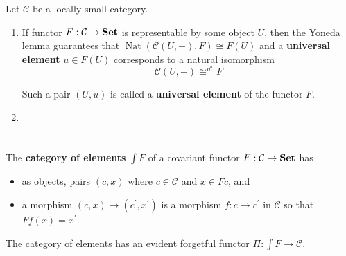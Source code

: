 \documentclass[12pt, oneside]{book}
\begin{document}
\begin{definition}
    Let $\mathcal{C}$ be a locally small category.
    \begin{enumerate}
        \item
              If functor $F:\mathcal{C}\to\mathbf{Set}$ is representable by some object $U$, then the Yoneda lemma guarantees that
              $\operatorname{Nat}(\mathcal{C}(U,-), F) \cong F \left(U\right)$
              and a \textbf{universal element} $ u\in F\left(U\right)$ corresponds to a natural isomorphism
              \begin{equation*}
                  \mathcal{C}(U,-)\cong^{\eta^u} F
              \end{equation*}


              Such a pair $(U, u)$ is called a \textbf{universal element} of the functor $F$.
        \item

    \end{enumerate}
\end{definition}


\section{}

\begin{definition}
    The \textbf{category of elements} $\int F$ of a covariant functor $F: \mathcal{C} \rightarrow \mathbf{Set}$ has
    \begin{itemize}
        \item
              as objects, pairs $\left(c, x\right)$ where $c \in \mathcal{C}$ and $x \in F c$, and
        \item
              a morphism $\left(c, x\right) \rightarrow\left(c^{\prime}, x^{\prime}\right)$ is a morphism $f: c \rightarrow c^{\prime}$ in $\mathcal{C}$ so that $F f(x)=x^{\prime}$.
    \end{itemize}
    The category of elements has an evident forgetful functor $\Pi: \int F \rightarrow \mathcal{C}$.
\end{definition}
\end{document}
